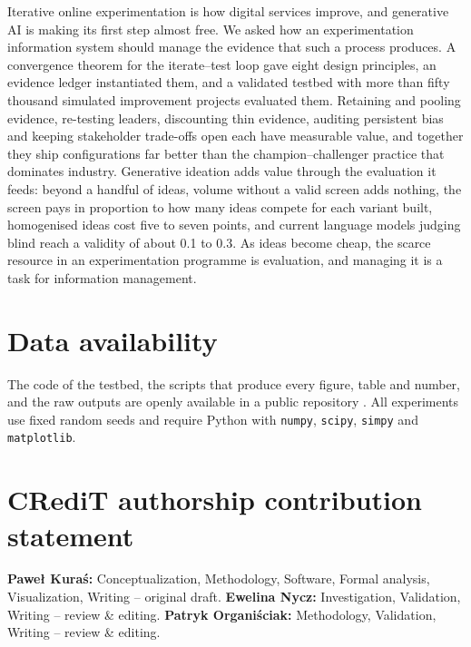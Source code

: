 \documentclass[preprint,12pt,authoryear]{elsarticle}
\newif\ifanon
\theoremstyle{definition}
\begin{document}
Iterative online experimentation is how digital services improve, and generative AI is making its first step almost free. We asked how an experimentation information system should manage the evidence that such a process produces. A convergence theorem for the iterate--test loop gave eight design principles, an evidence ledger instantiated them, and a validated testbed with more than fifty thousand simulated improvement projects evaluated them. Retaining and pooling evidence, re-testing leaders, discounting thin evidence, auditing persistent bias and keeping stakeholder trade-offs open each have measurable value, and together they ship configurations far better than the champion--challenger practice that dominates industry. Generative ideation adds value through the evaluation it feeds: beyond a handful of ideas, volume without a valid screen adds nothing, the screen pays in proportion to how many ideas compete for each variant built, homogenised ideas cost five to seven points, and current language models judging blind reach a validity of about 0.1 to 0.3. As ideas become cheap, the scarce resource in an experimentation programme is evaluation, and managing it is a task for information management.

\section*{Data availability}
\ifanon
The code of the testbed, the scripts that produce every figure, table and number, and the raw outputs are deposited in a public repository \citep{dataset2026}; its identifier is withheld for anonymous review. All experiments use fixed random seeds.
\else
The code of the testbed, the scripts that produce every figure, table and number, and the raw outputs are openly available in a public repository \citep{dataset2026}. All experiments use fixed random seeds and require Python with \texttt{numpy}, \texttt{scipy}, \texttt{simpy} and \texttt{matplotlib}.
\fi

\ifanon\else
\section*{CRediT authorship contribution statement}
\textbf{Pawe{\l} Kura{\'s}:} Conceptualization, Methodology, Software, Formal analysis, Visualization, Writing -- original draft. \textbf{Ewelina Nycz:} Investigation, Validation, Writing -- review \& editing. \textbf{Patryk Organi{\'s}ciak:} Methodology, Validation, Writing -- review \& editing.
\end{document}
